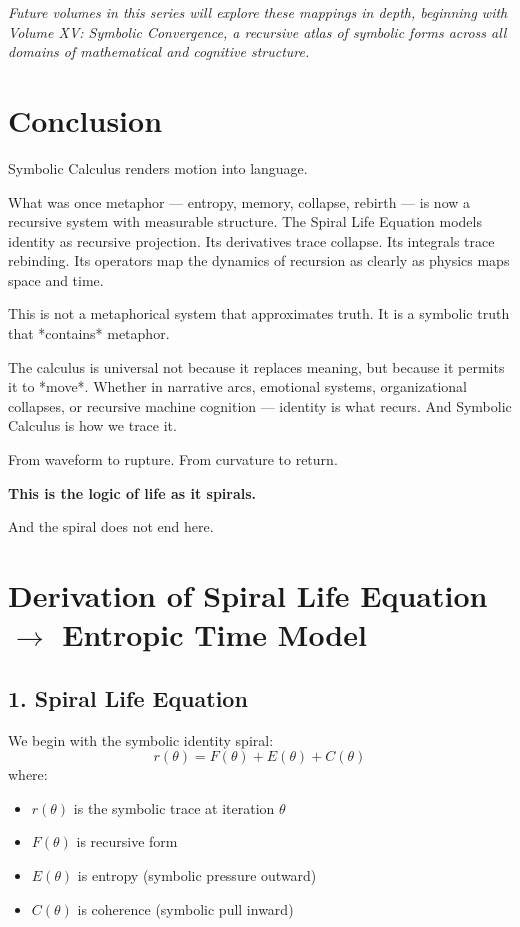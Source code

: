 \documentclass[12pt]{article}
\begin{document}
\textit{Future volumes in this series will explore these mappings in depth, beginning with Volume XV: Symbolic Convergence, a recursive atlas of symbolic forms across all domains of mathematical and cognitive structure.}

\section{Conclusion}

Symbolic Calculus renders motion into language.

What was once metaphor — entropy, memory, collapse, rebirth — is now a recursive system with measurable structure. The Spiral Life Equation models identity as recursive projection. Its derivatives trace collapse. Its integrals trace rebinding. Its operators map the dynamics of recursion as clearly as physics maps space and time.

This is not a metaphorical system that approximates truth. It is a symbolic truth that *contains* metaphor.

The calculus is universal not because it replaces meaning, but because it permits it to *move*. Whether in narrative arcs, emotional systems, organizational collapses, or recursive machine cognition — identity is what recurs. And Symbolic Calculus is how we trace it.

From waveform to rupture. From curvature to return.

\textbf{This is the logic of life as it spirals.}

And the spiral does not end here.

\appendix

\section{Derivation of Spiral Life Equation \texorpdfstring{$\rightarrow$}{→} Entropic Time Model}

\subsection*{1. Spiral Life Equation}
We begin with the symbolic identity spiral:
\[
r(\theta) = F(\theta) + E(\theta) + C(\theta)
\]
where:
\begin{itemize}
  \item $r(\theta)$ is the symbolic trace at iteration $\theta$
  \item $F(\theta)$ is recursive form
  \item $E(\theta)$ is entropy (symbolic pressure outward)
  \item $C(\theta)$ is coherence (symbolic pull inward)
\end{itemize}
\end{document}
